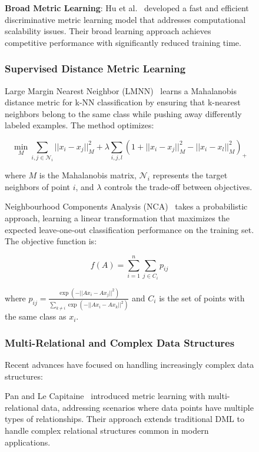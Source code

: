 \documentclass[review]{elsarticle}
\begin{document}
\begin{figure}[htbp]
\textbf{Broad Metric Learning}: Hu et al.~\cite{hu2025broad} developed a fast and efficient discriminative metric learning model that addresses computational scalability issues. Their broad learning approach achieves competitive performance with significantly reduced training time.

\subsubsection{Supervised Distance Metric Learning}

Large Margin Nearest Neighbor (LMNN)~\cite{weinberger2009distance} learns a Mahalanobis distance metric for k-NN classification by ensuring that k-nearest neighbors belong to the same class while pushing away differently labeled examples. The method optimizes:

\begin{equation}
\min_M \sum_{i,j \in \mathcal{N}_i} ||x_i - x_j||_M^2 + \lambda \sum_{i,j,l} (1 + ||x_i - x_j||_M^2 - ||x_i - x_l||_M^2)_+
\end{equation}

where $M$ is the Mahalanobis matrix, $\mathcal{N}_i$ represents the target neighbors of point $i$, and $\lambda$ controls the trade-off between objectives.

Neighbourhood Components Analysis (NCA)~\cite{goldberger2005neighbourhood} takes a probabilistic approach, learning a linear transformation that maximizes the expected leave-one-out classification performance on the training set. The objective function is:

\begin{equation}
f(A) = \sum_{i=1}^n \sum_{j \in C_i} p_{ij}
\end{equation}

where $p_{ij} = \frac{\exp(-||Ax_i - Ax_j||^2)}{\sum_{k \neq i} \exp(-||Ax_i - Ax_k||^2)}$ and $C_i$ is the set of points with the same class as $x_i$.

\subsubsection{Multi-Relational and Complex Data Structures}

Recent advances have focused on handling increasingly complex data structures:

Pan and Le Capitaine~\cite{pan2025metric} introduced metric learning with multi-relational data, addressing scenarios where data points have multiple types of relationships. Their approach extends traditional DML to handle complex relational structures common in modern applications.


\end{figure}
\end{document}
